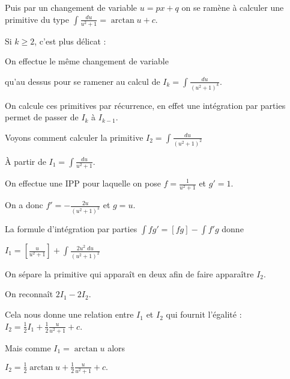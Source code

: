 \change

Puis par un changement de variable $u= px+q$ on se ramène à 
calculer une primitive du type 
$\int \frac{du}{u^2+1}=\arctan u + c$.


\change

Si $k\ge 2$, c'est plus délicat :

\change

 On effectue le même changement de variable 

\change

qu'au dessus pour
 se ramener au calcul de $I_k =\int \frac{du}{(u^2+1)^k}$.

\change

On calcule ces primitives par récurrence, en effet une
 intégration par parties permet de passer de $I_k$ à $I_{k-1}$.


\diapo

Voyons comment calculer la primitive $I_2= \int \frac{du}{(u^2+1)^2}$

\change

\`A partir de  $I_1=\int \frac{du}{u^2+1}$.

\change

On effectue une IPP pour laquelle on pose 
$f=\frac{1}{u^2+1}$ et $g'=1$. 

\change

On a donc $f'=-\frac{2u}{(u^2+1)^2}$ et $g=u$.

\change 

La formule d'intégration par parties $\int f g'=[f g]-\int f' g$ donne

\change

$I_1 =  \left[ \frac{u}{u^2+1} \right] + \int \frac{2u^2 \; du}{(u^2+1)^2}$

\change

On sépare la primitive qui apparaît en deux afin de faire apparaître $I_2$.

\change

\change

On reconnaît $2I_1-2I_2$.

\change

Cela nous donne une relation entre $I_1$ et $I_2$ qui fournit l'égalité :
$I_2 = \frac12 I_1 + \frac12\frac{u}{u^2+1} + c$.

\change


Mais comme $I_1=\arctan u$ alors

\change

$I_2  =  \frac12 \arctan u + \frac12\frac{u}{u^2+1} + c.$


